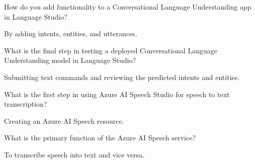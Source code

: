 \begin{qanda}
	\begin{question}
How do you add functionality to a Conversational Language Understanding app in Language Studio?
	\end{question}
	\begin{answer}
By adding intents, entities, and utterances.
	\end{answer}
\end{qanda}

\begin{qanda}
	\begin{question}
What is the final step in testing a deployed Conversational Language Understanding model in Language Studio?
	\end{question}
	\begin{answer}
Submitting text commands and reviewing the predicted intents and entities.
	\end{answer}
\end{qanda}

\begin{qanda}
	\begin{question}
What is the first step in using Azure AI Speech Studio for speech to text transcription?
	\end{question}
	\begin{answer}
Creating an Azure AI Speech resource.
	\end{answer}
\end{qanda}

\begin{qanda}
	\begin{question}
What is the primary function of the Azure AI Speech service?
	\end{question}
	\begin{answer}
To transcribe speech into text and vice versa.
	\end{answer}
\end{qanda}

\begin{qanda}
	\begin{question}

	\end{question}
	\begin{answer}

	\end{answer}
\end{qanda}

\begin{qanda}
	\begin{question}

	\end{question}
	\begin{answer}

	\end{answer}
\end{qanda}

